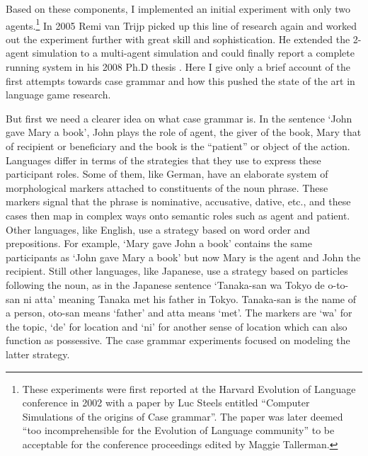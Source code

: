 Based on these components, I implemented an initial experiment with only two agents.\footnote{These experiments were first reported at the Harvard Evolution of Language conference in 2002 with a paper by Luc Steels
entitled ``Computer Simulations of the origins of Case grammar''. The paper was later deemed 
``too incomprehensible for the Evolution of Language community'' to be acceptable for the conference 
proceedings edited by Maggie Tallerman.}
In 2005 Remi van Trijp picked up this line of research again and worked out the experiment 
further with great skill and sophistication. He extended the 
2-agent simulation to a multi-agent simulation and could finally report a complete running system in his 2008 Ph.D 
thesis \citep{VanTrijp:2014}. Here I give only a brief account of the first attempts towards case grammar
and how this pushed the state of the art in language game research. 

But first we need a clearer idea on what case grammar is.
In the sentence `John gave Mary a book', John plays the role of agent, the giver 
of the book, Mary that of recipient or 
beneficiary and the book is the ``patient'' or object of the action. Languages differ in terms of the strategies that they 
use to express these participant roles. Some of them, like German, have an elaborate system of morphological 
markers attached to constituents of the noun phrase. These markers signal that the 
phrase is nominative, accusative, dative, etc., and these cases then map in complex ways 
onto semantic roles such as agent and patient.
Other languages, like English, use a strategy based on word order and prepositions. For example, 
`Mary gave John a book' contains the same participants as `John gave Mary a book' but now Mary is the 
agent and John the recipient. Still other languages, like Japanese, use a strategy based on particles following 
the noun, as in the Japanese sentence `Tanaka-san wa Tokyo de o-to-san ni atta' 
meaning Tanaka met his father in Tokyo. Tanaka-san is the name of a person, oto-san means `father' and atta 
means `met'. The markers are `wa' for the topic, `de' for location and `ni' for another sense of location which can 
also function as possessive. The case grammar experiments focused on modeling the latter strategy. 

